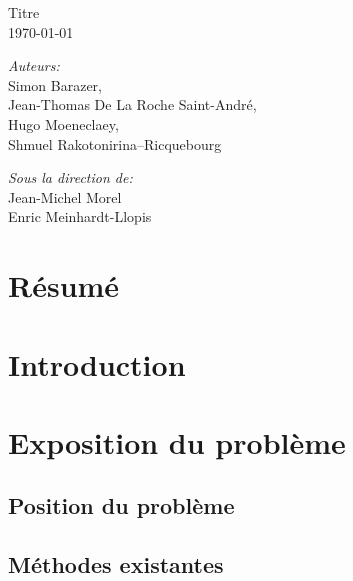 \documentclass[a4paper,11pt]{article}
\begin{document}
   	\begin{titlepage}
	\begin{center}
	\vspace*{\fill}

		\vspace{0.3cm}
		{\huge Titre}\\
		\vspace{1.5cm}
	\today
	\vspace{1.5cm}

	\noindent
	\begin{minipage}[t]{0.4\textwidth}
		\begin{flushleft} \large
			\emph{Auteurs:}\\
			Simon Barazer,\\
			Jean-Thomas De La Roche Saint-André,\\
			Hugo Moeneclaey, \\
			Shmuel Rakotonirina--Ricquebourg
		\end{flushleft}
	\end{minipage}%
	\begin{minipage}[t]{0.4\textwidth}
		\begin{flushright} \large
			\emph{Sous la direction de:}\\ 
			Jean-Michel Morel \\
			Enric Meinhardt-Llopis
		\end{flushright}
	\end{minipage}

	\vfill
	\end{center}
   	\section*{Résumé}
   		
	\end{titlepage}
	\tableofcontents
	\section*{Introduction}
		
	\section{Exposition du problème}
		\subsection{Position du problème}
		\subsection{Méthodes existantes}
\end{document}
